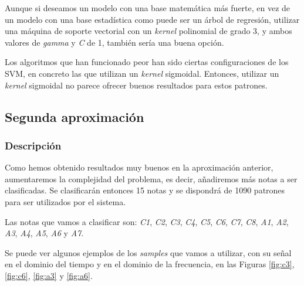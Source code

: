 \documentclass[12pt]{article}
\begin{document}
\bigskip
Aunque si deseamos un modelo con una base matemática más fuerte, en vez de un modelo con una base estadística como puede ser un árbol de regresión,
utilizar una máquina de soporte vectorial con un \textit{kernel} polinomial de grado 3, y ambos valores de \textit{gamma} y \textit{C} de 1, también sería una buena opción. 

Los algoritmos que han funcionado peor han sido ciertas configuraciones de los SVM, en concreto las que utilizan un \textit{kernel} sigmoidal.
Entonces, utilizar un \textit{kernel} sigmoidal no parece ofrecer buenos resultados para estos patrones.

\newpage
\subsection{Segunda aproximación}
\label{Segunda aproximación}

\subsubsection{Descripción}
Como hemos obtenido resultados muy buenos en la aproximación anterior, aumentaremos la complejidad del problema,
es decir, añadiremos más notas a ser clasificadas. Se clasificarán entonces 15 notas y se dispondrá de 
1090 patrones para ser utilizados por el sistema.

Las notas que vamos a clasificar son: \textit{C1}, \textit{C2}, \textit{C3}, \textit{C4}, \textit{C5}, \textit{C6}, \textit{C7}, \textit{C8}, \textit{A1}, \textit{A2}, \textit{A3}, \textit{A4}, \textit{A5}, \textit{A6} y \textit{A7}.

\bigskip
Se puede ver algunos ejemplos de los \textit{samples} que vamos a utilizar, con su señal en el dominio del tiempo y en el
dominio de la frecuencia, en las Figuras \ref{fig:c3}, \ref{fig:c6}, \ref{fig:a3} y \ref{fig:a6}.
\end{document}
